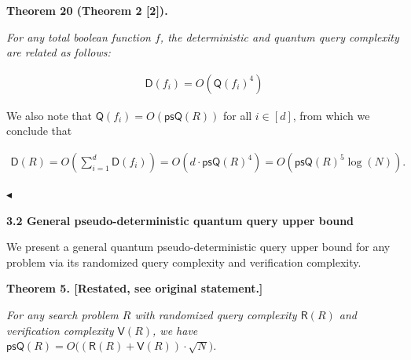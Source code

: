 \par\medskip\noindent\textbf{
\textbf{Theorem 20}\textbf{ }(Theorem 2 [2])\textbf{.}
}\par



\emph{For any total boolean function $f$, the deterministic and quantum query complexity are related as follows:}\par


\[\begin{gathered}
\mathsf{D}(f_{i})=O(\mathsf{Q}(f_{i})^{4})
\end{gathered}\]






We also note that $\mathsf{Q}(f_{i})=O(\mathsf{psQ}(R))$ for all $i\in[d]$, from which we conclude that\par


\[\begin{gathered}
\mathsf{D}(R)=O\left(\sum_{i=1}^{d}\mathsf{D}(f_{i})\right)=O(d\cdot\mathsf{psQ}(R)^{4})=O(\mathsf{psQ}({R})^{5}\log(N)).\
\end{gathered}\]


$\blacktriangleleft$\par






\par\medskip\noindent\textbf{
3.2 General pseudo-deterministic quantum query upper bound}\par




We present a general quantum pseudo-deterministic query upper bound for any problem via its randomized query complexity and verification complexity.\par






\par\medskip\noindent\textbf{
\textbf{Theorem 5}\textbf{.}
[Restated, see original statement.]}\par



\emph{For any search problem ${R}$ with randomized query complexity $\mathsf{R}(R)$ and verification complexity $\mathsf{V}(R)$, we have $\mathsf{psQ}(R)=O\big((\mathsf{R}(R)+\mathsf{V}(R))\cdot\sqrt{N}\big)$.}\par



